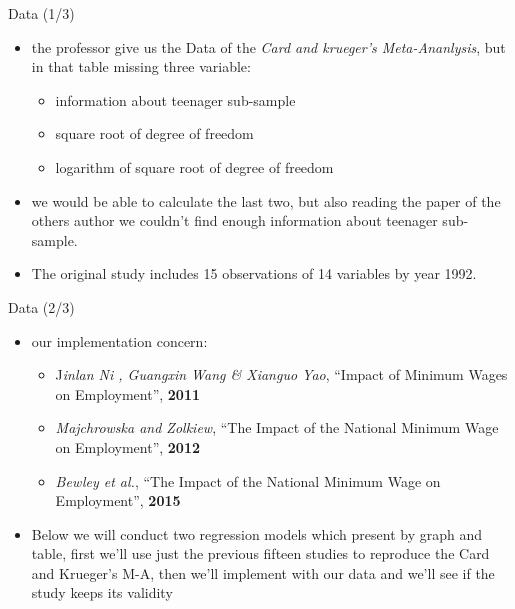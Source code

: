 \documentclass[
  9 pt,
  ignorenonframetext,
]{beamer}
\begin{document}
\begin{frame}{Data (1/3)}
\protect\hypertarget{data-13}{}
\begin{itemize}
\item
  the professor give us the Data of the \emph{Card and krueger's
  Meta-Ananlysis}, but in that table missing three variable:

  \begin{itemize}
  \item
    information about teenager sub-sample
  \item
    square root of degree of freedom
  \item
    logarithm of square root of degree of freedom
  \end{itemize}
\item
  we would be able to calculate the last two, but also reading the paper
  of the others author we couldn't find enough information about
  teenager sub-sample.
\item
  The original study includes 15 observations of 14 variables by year
  1992.
\end{itemize}
\end{frame}

\begin{frame}{Data (2/3)}
\protect\hypertarget{data-23}{}
\begin{itemize}
\item
  our implementation concern:

  \begin{itemize}
  \item
    J\emph{inlan Ni , Guangxin Wang \& Xianguo Yao}, ``Impact of Minimum
    Wages on Employment'', \textbf{2011}
  \item
    \emph{Majchrowska and Zolkiew}, ``The Impact of the National Minimum
    Wage on Employment'', \textbf{2012}
  \item
    \emph{Bewley et al.}, ``The Impact of the National Minimum Wage on
    Employment'', \textbf{2015}
  \end{itemize}
\item
  Below we will conduct two regression models which present by graph and
  table, first we'll use just the previous fifteen studies to reproduce
  the Card and Krueger's M-A, then we'll implement with our data and
  we'll see if the study keeps its validity
\end{itemize}
\end{frame}
\end{document}
